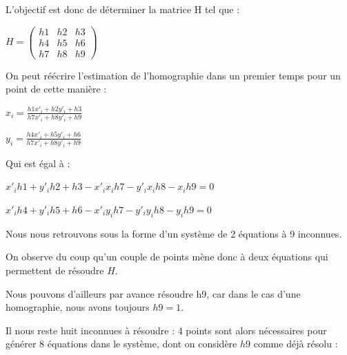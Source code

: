         L'objectif est donc de déterminer la matrice H tel que :
    
        \begin{center}
        $ H = \begin{pmatrix} h1 & h2 & h3 \\ h4 & h5 & h6 \\ h7 & h8 & h9 \end{pmatrix} $
        \end{center}
    
        On peut réécrire l'estimation de l'homographie dans un premier temps pour un point de cette manière :

        \begin{center}
            $x_i = \frac{h1x'_i + h2y'_i + h3}{h7x'_i + h8y'_i + h9} $  
        \end{center}
    
        \begin{center}
            $y_i = \frac{h4x'_i + h5y'_i + h6}{h7x'_i + h8y'_i + h9} $
        \end{center}
    
        Qui est égal à :
    
        \begin{center}
            $ x'_ih1 + y'_ih2 + h3 - x'_i x_ih7 - y'_ix_ih8 - x_ih9 = 0 $
    
            $ x'_ih4 + y'_ih5 + h6 - x'_iy_ih7 - y'_iy_ih8 - y_ih9 = 0 $
        \end{center}

        Nous nous retrouvons sous la forme d'un système de 2 équations à 9 inconnues.

        On observe du coup qu'un couple de points mène donc à deux équations qui permettent de résoudre $H$. 
        
        Nous pouvons d'ailleurs par avance résoudre h9, car dans le cas d'une homographie, nous avons toujours $h9 = 1$. 
        
        Il nous reste huit inconnues à résoudre : 4 points sont alors nécessaires pour générer 8 équations dans le système, dont on considère $h9$ comme déjà résolu : 


